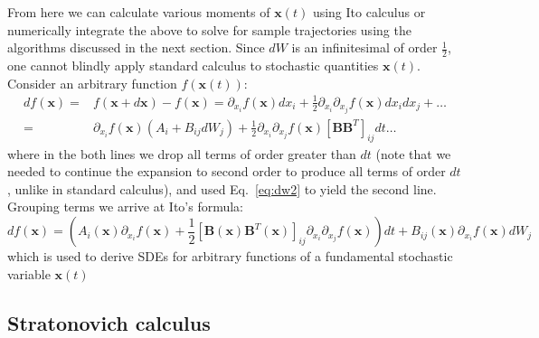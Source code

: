 \documentclass[notitlepage,pra,10pt,aps]{revtex4-2}
\newcommand {\be}{\begin{equation}}
\newcommand {\ee}{\end{equation}}
\begin{document}
From here we can calculate various moments of $\mathbf{x}(t)$ using Ito calculus or numerically integrate the above to solve for sample trajectories using the algorithms discussed in the next section.  Since $dW$ is an infinitesimal of order $\frac{1}{2}$, one cannot blindly apply standard calculus to stochastic quantities $\mathbf{x}(t)$.  Consider an arbitrary function $f(\mathbf{x}(t))$:
\begin{align}
df(\mathbf{x})=&f(\mathbf{x}+d\mathbf{x})-f(\mathbf{x})=\partial_{x_i}f(\mathbf{x})dx_i +\frac{1}{2}\partial_{x_i}\partial_{x_j}f(\mathbf{x})dx_idx_j+\dots \nonumber \\
=&\partial_{x_i}f(\mathbf{x})\left(A_i+B_{ij}dW_j\right)+\frac{1}{2}\partial_{x_i}\partial_{x_j}f(\mathbf{x})\left[\mathbf{B}\mathbf{B}^T\right]_{ij}dt   \dots \label{eq:itocalc}
\end{align}
where in the both lines we drop all terms of order greater than $dt$ (note that we needed to continue the expansion to second order to produce all terms of order $dt$, unlike in standard calculus), and used Eq.~\eqref{eq:dw2} to yield the second line. Grouping terms we arrive at Ito's formula:
\be
df(\mathbf{x})=\left(A_i(\mathbf{x})\partial_{x_i}f(\mathbf{x})+ \frac{1}{2} \left[\mathbf{B}(\mathbf{x})\mathbf{B}^T(\mathbf{x})\right]_{ij}\partial_{x_i}\partial_{x_j}f(\mathbf{x})\right)dt
+B_{ij}(\mathbf{x})\partial_{x_i}f(\mathbf{x})dW_j \label{eq:itos}
\ee
 which is used to derive SDEs for arbitrary functions of a fundamental stochastic variable $\mathbf{x}(t)$

\subsection{Stratonovich calculus}
\end{document}
